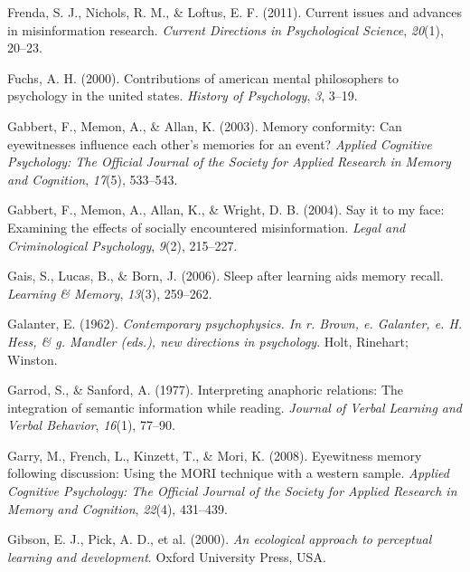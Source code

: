 \documentclass[
]{krantz}
\newlength{\cslhangindent}
\newlength{\cslentryspacingunit} %
\newenvironment{CSLReferences}[2] %
 {%
  \setlength{\parindent}{0pt}
  \ifodd #1
  \let\oldpar\par
  \def\par{\hangindent=\cslhangindent\oldpar}
  \fi
  \setlength{\parskip}{#2\cslentryspacingunit}
 }%
 {}
\begin{document}
\begin{CSLReferences}{1}{0}
\leavevmode{}%
Frenda, S. J., Nichols, R. M., \& Loftus, E. F. (2011). Current issues and advances in misinformation research. \emph{Current Directions in Psychological Science}, \emph{20}(1), 20--23.

\leavevmode{}%
Fuchs, A. H. (2000). Contributions of american mental philosophers to psychology in the united states. \emph{History of Psychology}, \emph{3}, 3--19.

\leavevmode{}%
Gabbert, F., Memon, A., \& Allan, K. (2003). Memory conformity: Can eyewitnesses influence each other's memories for an event? \emph{Applied Cognitive Psychology: The Official Journal of the Society for Applied Research in Memory and Cognition}, \emph{17}(5), 533--543.

\leavevmode{}%
Gabbert, F., Memon, A., Allan, K., \& Wright, D. B. (2004). Say it to my face: Examining the effects of socially encountered misinformation. \emph{Legal and Criminological Psychology}, \emph{9}(2), 215--227.

\leavevmode{}%
Gais, S., Lucas, B., \& Born, J. (2006). Sleep after learning aids memory recall. \emph{Learning \& Memory}, \emph{13}(3), 259--262.

\leavevmode{}%
Galanter, E. (1962). \emph{Contemporary psychophysics. In r. Brown, e. Galanter, e. H. Hess, \& g. Mandler (eds.), new directions in psychology}. Holt, Rinehart; Winston.

\leavevmode{}%
Garrod, S., \& Sanford, A. (1977). Interpreting anaphoric relations: The integration of semantic information while reading. \emph{Journal of Verbal Learning and Verbal Behavior}, \emph{16}(1), 77--90.

\leavevmode{}%
Garry, M., French, L., Kinzett, T., \& Mori, K. (2008). Eyewitness memory following discussion: Using the MORI technique with a western sample. \emph{Applied Cognitive Psychology: The Official Journal of the Society for Applied Research in Memory and Cognition}, \emph{22}(4), 431--439.

\leavevmode{}%
Gibson, E. J., Pick, A. D., et al. (2000). \emph{An ecological approach to perceptual learning and development}. Oxford University Press, USA.


\end{CSLReferences}
\end{document}
